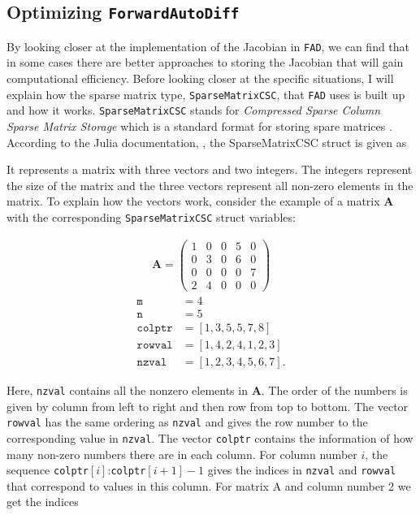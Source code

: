 \subsection{Optimizing \texttt{ForwardAutoDiff}}
By looking closer at the implementation of the Jacobian in \texttt{FAD}, we can find that in some cases there are better approaches to storing the Jacobian that will gain computational efficiency. Before looking closer at the specific situations, I will explain how the sparse matrix type, \texttt{SparseMatrixCSC}, that \texttt{FAD} uses is built up and how it works. \texttt{SparseMatrixCSC} stands for \textit{Compressed Sparse Column Sparse Matrix Storage} which is a standard format for storing spare matrices \citep{doi:10.1137/1.9780898718003.ch3}. According to the Julia documentation, \emph{\citet{SparseMatrixCSC}}, the SparseMatrixCSC struct is given as

It represents a matrix with three vectors and two integers. The integers represent the size of the matrix and the three vectors represent all non-zero elements in the matrix. To explain how the vectors work, consider the example of a matrix \textbf{A} with the corresponding \texttt{SparseMatrixCSC} struct variables:
\begin{multicols}{2}
    \begin{align*}
        \textbf{A} = \begin{pmatrix}
        1&0&0&5&0\\
        0&3&0&6&0\\
        0&0&0&0&7\\
        2&4&0&0&0\end{pmatrix}
    \end{align*}
    \columnbreak
    \begin{align*}
        \texttt{m} &= 4\\
        \texttt{n} &= 5\\
        \texttt{colptr} &= [1, 3, 5, 5, 7, 8]\\
        \texttt{rowval} &= [1, 4, 2, 4, 1, 2, 3]\\
        \texttt{nzval} &= [1, 2, 3, 4, 5, 6, 7].
    \end{align*}
\end{multicols}
Here, \texttt{nzval} contains all the nonzero elements in \textbf{A}. The order of the numbers is given by column from left to right and then row from top to bottom. The vector \texttt{rowval} has the same ordering as \texttt{nzval} and gives the row number to the corresponding value in \texttt{nzval}. The vector \texttt{colptr} contains the information of how many non-zero numbers there are in each column. For column number $i$, the sequence \texttt{colptr}$[i]$:\texttt{colptr}$[i+1]-1$ gives the indices in \texttt{nzval} and \texttt{rowval} that correspond to values in this column. For matrix A and column number 2 we get the indices
